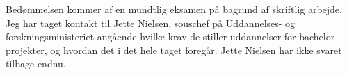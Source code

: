 \documentclass{report}
\begin{document}
\noindent Bedømmelsen kommer af en mundtlig eksamen på bagrund af skriftlig arbejde.\\

\noindent\newline Jeg har taget kontakt til Jette Nielsen, souschef på Uddannelses- og forskningsministeriet angående hvilke krav 
de stiller uddannelser for bachelor projekter, og hvordan det i det hele taget foregår. 
Jette Nielsen har ikke svaret tilbage endnu.



\end{document}
